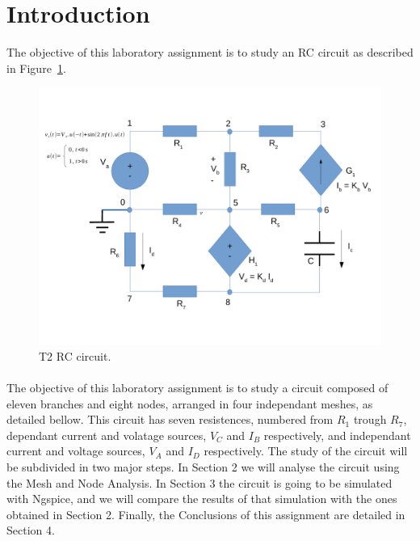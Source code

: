 \section{Introduction}
\label{sec:introduction}


\par The objective of this laboratory assignment is to study an RC circuit as described in Figure~\ref{fig:rc}.


\begin{figure}[h]
\centering
\includegraphics[width=0.9\linewidth]{../doc/rc.pdf}
\caption{T2 RC circuit.}
\label{fig:rc}
\end{figure}


\paragraph{} The objective of this laboratory assignment is to study a circuit composed of eleven branches and eight nodes, arranged in four independant meshes,
 as detailed bellow. This circuit has seven resistences, numbered from $R_1$ trough $R_7$, dependant current and volatage sources, $V_C$ and $I_B$ respectively,
 and independant current and voltage sources, $V_A$ and $I_D$ respectively.
The study of the circuit will be subdivided in two major steps. In Section 2 we will analyse the circuit using the Mesh and Node Analysis. In Section 3 the circuit is going to be simulated with Ngspice, and we will compare the results of that simulation with the ones obtained in Section 2.
Finally, the Conclusions of this assignment are detailed in Section 4.

